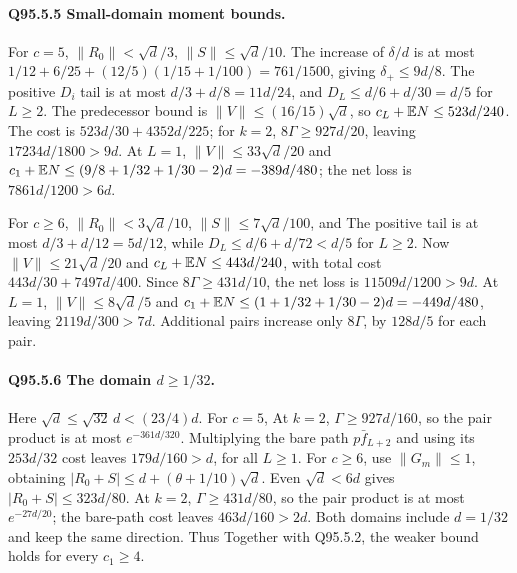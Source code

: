 \paragraph{Q95.5.5 Small-domain moment bounds.}
For \(c=\allowbreak 5\), \(\|R_0\|<\allowbreak \sqrt d/3\), \(\|S\|\le\allowbreak \sqrt d/10\).
The increase of \(\delta/d\) is at most
\(1/12+6/25+(12/5)(1/15+1/100)=\allowbreak 761/1500\), giving
\(\delta_+\le\allowbreak 9d/8\).
The positive \(D_i\) tail is at most \(d/3+d/8=\allowbreak 11d/24\), and
\(D_L\le\allowbreak  d/6+d/30=\allowbreak d/5\) for \(L\ge\allowbreak 2\).
The predecessor bound is \(\|V\|\le\allowbreak (16/15)\sqrt d\), so
\(c_L+\mathbb E N\le\allowbreak 523d/240\).
The cost is \(523d/30+4352d/225\); for \(k=\allowbreak 2\),
\(8\Gamma\ge\allowbreak 927d/20\), leaving \(17234d/1800>\allowbreak 9d\).
At \(L=\allowbreak 1\), \(\|V\|\le\allowbreak 33\sqrt d/20\) and
\(c_1+\mathbb E N\le\allowbreak (9/8+1/32+1/30-2)d=\allowbreak -389d/480\);
the net loss is \(7861d/1200>\allowbreak 6d\).

For \(c\ge\allowbreak 6\), \(\|R_0\|<\allowbreak 3\sqrt d/10\), \(\|S\|\le\allowbreak 7\sqrt d/100\),
and
The positive tail is at most \(d/3+d/12=\allowbreak 5d/12\), while
\(D_L\le\allowbreak  d/6+d/72<\allowbreak d/5\) for \(L\ge\allowbreak 2\).
Now \(\|V\|\le\allowbreak 21\sqrt d/20\) and \(c_L+\mathbb E N\le\allowbreak 443d/240\), with
total cost \(443d/30+7497d/400\). Since \(8\Gamma\ge\allowbreak 431d/10\),
the net loss is \(11509d/1200>\allowbreak 9d\).
At \(L=\allowbreak 1\), \(\|V\|\le\allowbreak 8\sqrt d/5\) and
\(c_1+\mathbb E N\le\allowbreak (1+1/32+1/30-2)d=\allowbreak -449d/480\), leaving
\(2119d/300>\allowbreak 7d\). Additional pairs increase only \(8\Gamma\), by
\(128d/5\) for each pair.

\paragraph{Q95.5.6 The domain \(d\ge\allowbreak 1/32\).}
Here \(\sqrt d\le\allowbreak \sqrt{32}\,\allowbreak d<\allowbreak (23/4)d\).
For \(c=\allowbreak 5\),
At \(k=\allowbreak 2\), \(\Gamma\ge\allowbreak 927d/160\), so the pair product is at most
\(e^{-361d/320}\). Multiplying the bare path \(p\bar f_{L+2}\) and
using its \(253d/32\) cost leaves \(179d/160>\allowbreak d\), for all \(L\ge\allowbreak 1\).
For \(c\ge\allowbreak 6\), use \(\|G_m\|\le\allowbreak 1\), obtaining
\(|R_0+S|\le\allowbreak  d+(\theta+1/10)\sqrt d\).
Even \(\sqrt d<\allowbreak 6d\) gives \(|R_0+S|\le\allowbreak 323d/80\).
At \(k=\allowbreak 2\), \(\Gamma\ge\allowbreak 431d/80\), so the pair product is at most
\(e^{-27d/20}\); the bare-path cost leaves \(463d/160>\allowbreak 2d\).
Both domains include \(d=\allowbreak 1/32\) and keep the same direction. Thus
Together with Q95.5.2, the weaker bound holds for every \(c_1\ge\allowbreak 4\).

